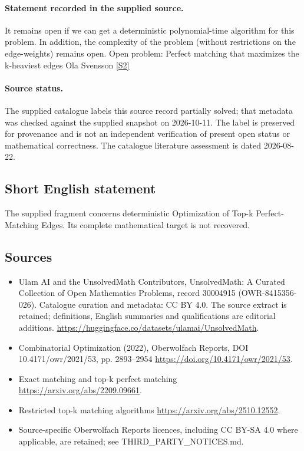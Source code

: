 \documentclass[11pt]{article}
\newcommand{\sref}[2]{\hyperlink{source:#1:#2}{[S#2]}}
\begin{document}
\paragraph{Statement recorded in the supplied source.}
It remains open if we can get a deterministic polynomial-time algorithm for this problem. In addition, the complexity of the problem (without restrictions on the edge-weights) remains open. Open problem: Perfect matching that maximizes the k-heaviest edges Ola Svensson \sref{30004915}{2}
\paragraph{Source status.}
The supplied catalogue labels this source record partially solved; that metadata was checked against the supplied snapshot on 2026-10-11. The label is preserved for provenance and is not an independent verification of present open status or mathematical correctness. The catalogue literature assessment is dated 2026-08-22.
\subsection{Short English statement}
The supplied fragment concerns deterministic Optimization of Top-k Perfect-Matching Edges. Its complete mathematical target is not recovered.
\subsection{Sources}
\begin{itemize}
\item[\hypertarget{source:30004915:1}{S1}] Ulam AI and the UnsolvedMath Contributors, UnsolvedMath: A Curated Collection of Open Mathematics Problems, record 30004915 (OWR-8415356-026). Catalogue curation and metadata: CC BY 4.0. The source extract is retained; definitions, English summaries and qualifications are editorial additions.
\url{https://huggingface.co/datasets/ulamai/UnsolvedMath}.
\item[\hypertarget{source:30004915:2}{S2}] Combinatorial Optimization (2022), Oberwolfach Reports, DOI 10.4171/owr/2021/53, pp. 2893--2954
\url{https://doi.org/10.4171/owr/2021/53}.
\item[\hypertarget{source:30004915:3}{S3}] Exact matching and top-k perfect matching
\url{https://arxiv.org/abs/2209.09661}.
\item[\hypertarget{source:30004915:4}{S4}] Restricted top-k matching algorithms
\url{https://arxiv.org/abs/2510.12552}.
\item Source-specific Oberwolfach Reports licences, including CC BY-SA 4.0 where applicable, are retained; see THIRD\_PARTY\_NOTICES.md.
\end{itemize}
\end{document}
